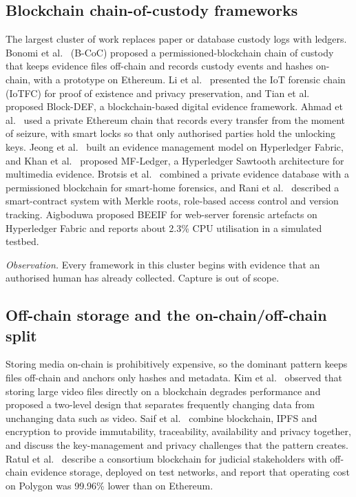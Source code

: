 \documentclass[conference,a4paper,10pt]{IEEEtran}
\begin{document}
\subsection{Blockchain chain-of-custody frameworks}
The largest cluster of work replaces paper or database custody logs with ledgers. Bonomi et al.\ \cite{bonomi} (B-CoC) proposed a permissioned-blockchain chain of custody that keeps evidence files off-chain and records custody events and hashes on-chain, with a prototype on Ethereum. Li et al.\ \cite{sli} presented the IoT forensic chain (IoTFC) for proof of existence and privacy preservation, and Tian et al.\ \cite{tian} proposed Block-DEF, a blockchain-based digital evidence framework. Ahmad et al.\ \cite{ahmad} used a private Ethereum chain that records every transfer from the moment of seizure, with smart locks so that only authorised parties hold the unlocking keys. Jeong et al.\ \cite{jeong} built an evidence management model on Hyperledger Fabric, and Khan et al.\ \cite{khan} proposed MF-Ledger, a Hyperledger Sawtooth architecture for multimedia evidence. Brotsis et al.\ \cite{brotsis} combined a private evidence database with a permissioned blockchain for smart-home forensics, and Rani et al.\ \cite{rani} described a smart-contract system with Merkle roots, role-based access control and version tracking. Aigboduwa \cite{aigboduwa} proposed BEEIF for web-server forensic artefacts on Hyperledger Fabric and reports about 2.3\% CPU utilisation in a simulated testbed.

\emph{Observation.} Every framework in this cluster begins with evidence that an authorised human has already collected. Capture is out of scope.

\subsection{Off-chain storage and the on-chain/off-chain split}
Storing media on-chain is prohibitively expensive, so the dominant pattern keeps files off-chain and anchors only hashes and metadata. Kim et al.\ \cite{kim} observed that storing large video files directly on a blockchain degrades performance and proposed a two-level design that separates frequently changing data from unchanging data such as video. Saif et al.\ \cite{saif} combine blockchain, IPFS and encryption to provide immutability, traceability, availability and privacy together, and discuss the key-management and privacy challenges that the pattern creates. Ratul et al.\ \cite{ratul} describe a consortium blockchain for judicial stakeholders with off-chain evidence storage, deployed on test networks, and report that operating cost on Polygon was 99.96\% lower than on Ethereum.
\end{document}
